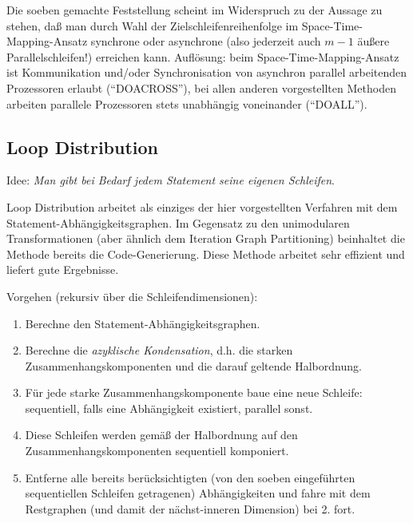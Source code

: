 Die soeben gemachte Feststellung scheint im Widerspruch zu der Aussage
zu stehen, daß man durch Wahl der Zielschleifenreihenfolge im
Space-Time-Mapping-Ansatz synchrone oder asynchrone (also jederzeit auch
$m\!-\!1$ äußere Parallelschleifen!) erreichen kann. Auflösung: beim
Space-Time-Mapping-Ansatz ist Kommunikation und/oder Synchronisation von
asynchron parallel arbeitenden Prozessoren erlaubt (``DOACROSS''), bei allen
anderen vorgestellten Methoden arbeiten parallele Prozessoren stets
unabhängig voneinander (``DOALL''). 


\subsection{Loop Distribution}

Idee: \textit{Man gibt bei Bedarf jedem Statement seine eigenen
  Schleifen}.

Loop Distribution arbeitet als einziges der hier vorgestellten Verfahren
mit dem Statement-Abhängigkeitsgraphen. Im Gegensatz zu den unimodularen
Transformationen (aber ähnlich dem Iteration Graph Partitioning)
beinhaltet die Methode bereits die Code-Generierung. Diese Methode
arbeitet sehr effizient und liefert gute Ergebnisse.

Vorgehen (rekursiv über die Schleifendimensionen):\\[-3ex]
\begin{enumerate}
\item Berechne den Statement-Abhängigkeitsgraphen.\\[-4ex]
\item Berechne die \emph{azyklische Kondensation}, d.h. die starken
  Zusammenhangskomponenten und die darauf geltende Halbordnung.\\[-4ex]
\item Für jede starke Zusammenhangskomponente baue eine neue Schleife:
  sequentiell, falls eine Abhängigkeit existiert, parallel sonst.\\[-4ex]
\item Diese Schleifen werden gemäß der Halbordnung auf den
  Zusammenhangskomponenten sequentiell komponiert.\\[-4ex]
\item Entferne alle bereits berücksichtigten (von den soeben
  eingeführten sequentiellen Schleifen getragenen) Abhängigkeiten und
  fahre mit dem Restgraphen (und damit der nächst-inneren Dimension) bei
  2. fort.
\end{enumerate}

